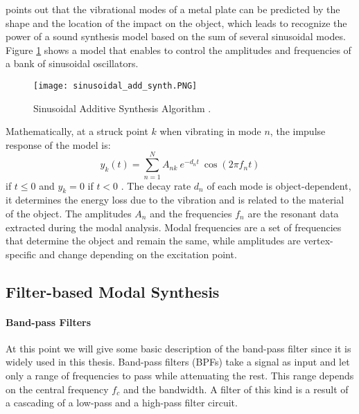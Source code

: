 \cite{Cook:2002:RSS:515316} points out that the vibrational modes of a  metal plate can be predicted by the shape and the location of the impact on the object, which leads to recognize the power of a sound synthesis model based on the sum of several sinusoidal modes. Figure \ref{fig:sin_add_synth} shows a model that enables to control the amplitudes and frequencies of a bank of sinusoidal oscillators.

\begin{figure}[H]
  \centering
    \texttt{[image: sinusoidal\_add\_synth.PNG]}
      \caption{Sinusoidal Additive Synthesis Algorithm \cite{Cook:2002:RSS:515316}.}
      \label{fig:sin_add_synth}
\end{figure}

Mathematically, at a struck point $k$ when vibrating in mode $n$, the impulse response of the model is:
\begin{equation}\label{eq:modal_response}
y_k(t) = \sum\limits_{n=1}^{N} A_{nk}\ e^{-d_n t}\ \cos(2 \pi f_nt)
\end{equation}
if $t\leqslant 0$ and $y_k = 0$ if $t<0$ \cite{van2001foleyautomatic}. The decay rate $d_n$ of each mode is object-dependent, it determines the energy loss due to the vibration and is related to the material of the object. The amplitudes $A_n$ and the frequencies $f_n$ are the resonant data extracted during the modal analysis. Modal frequencies are a set of frequencies that determine the object and remain the same, while amplitudes are vertex-specific and change depending on the excitation point.

\subsection{Filter-based Modal Synthesis}\label{sec:add_synth}

\paragraph{Band-pass Filters\\}\label{par:bpf}

At this point we will give some basic description of the band-pass filter since it is widely used in this thesis. Band-pass filters (\gls{BPF}s) take a signal as input and let only a range of frequencies to pass while attenuating the rest. This range depends on the central frequency $f_c$ and the bandwidth. A filter of this kind is a result of a cascading of a low-pass and a high-pass filter circuit.

